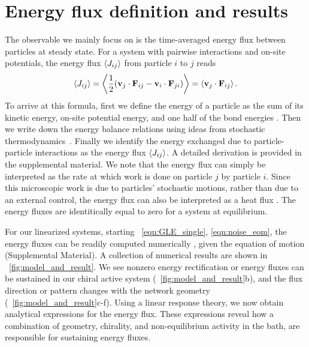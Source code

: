 \documentclass[
 preprint,
 preprintnumbers,
 amsmath,amssymb,
 aps,
 pre,
 longbibliography,
 superscriptaddress,
 10pt, twocolumn
]{revtex4-1}
\begin{document}
\section{Energy flux definition and results} \label{sec:flux}
The observable we mainly focus on is the time-averaged energy flux between particles at steady state. For a system with pairwise interactions and on-site potentials, the energy flux $\expval{J_{ij}}$ from particle $i$ to $j$ reads
\begin{equation} \label{eqn:flux_def}
    \expval{J_{ij}} = \expval{\frac{1}{2} (\mathbf{v}_j \cdot \mathbf{F}_{ij} - \mathbf{v}_i \cdot \mathbf{F}_{ji})}
    = \expval{\mathbf{v}_j \cdot \mathbf{F}_{ij}}.
\end{equation}
To arrive at this formula, first we define the energy of a particle as the sum of its kinetic energy, on-site potential energy, and one half of the bond energies \cite{Lepri2003ThermalConduction}. Then we write down the energy balance relations using ideas from stochastic thermodynamics~\cite{Sekimoto1998LangevinEquation}. Finally we identify the energy exchanged due to particle-particle interactions as the energy flux $\expval{J_{ij}}$. A detailed derivation is provided in the supplemental material.
We note that the energy flux can simply be interpreted as the rate at which work is done on particle $j$ by particle $i$.
Since this microscopic work is due to particles' stochastic motions, rather than due to an external control, the energy flux can also be interpreted as a heat flux \cite{Sekimoto1998LangevinEquation,Lepri2003ThermalConduction}. The energy fluxes are identitically equal to zero for a system at equilibrium.

For our linearized systems, starting \eqnname~\eqref{eqn:GLE_single}, \eqref{eqn:noise_eom}, the energy fluxes can be readily computed numerically \cite{Gardiner2009ItoCalculus,Ceriotti2010ColoredNoiseThermostats}, given the equation of motion  (Supplemental Material).
A collection of numerical results are shown in \figurename~\ref{fig:model_and_result}. We see nonzero energy rectification or energy fluxes can be sustained in our chiral active system (\figurename~\ref{fig:model_and_result}b), and the flux direction or pattern changes with the network geometry (\figurename~\ref{fig:model_and_result}c-f). Using a linear response theory, we now obtain analytical expressions for the energy flux. These expressions reveal how a combination of geometry, chirality, and non-equilibrium activity in the bath, are responsible for sustaining energy fluxes.
\end{document}
